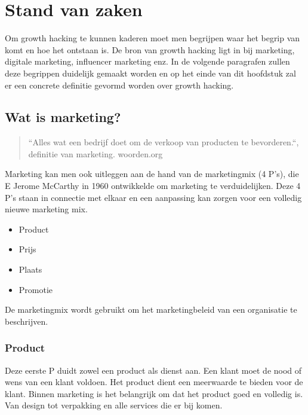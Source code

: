 \chapter{Stand van zaken}
\label{ch:stand-van-zaken}


Om growth hacking te kunnen kaderen moet men begrijpen waar het begrip van komt en hoe het ontstaan is. De bron van growth hacking ligt in bij marketing, digitale marketing, influencer marketing enz. In de volgende paragrafen zullen deze begrippen duidelijk gemaakt worden en op het einde van dit hoofdstuk zal er een concrete definitie gevormd worden over growth hacking.

\section{Wat is marketing?}
\label{sec:marketing}
\begin{quote}
	``Alles wat een bedrijf doet om de verkoop van producten te bevorderen.``, definitie van marketing. \textcopyright  woorden.org
\end{quote}
Marketing kan men ook uitleggen aan de hand van de marketingmix (4 P's), die E Jerome McCarthy in 1960 ontwikkelde om marketing te verduidelijken. Deze 4 P's staan in connectie met elkaar en een aanpassing kan zorgen voor een volledig nieuwe marketing mix.

\begin{itemize}
	\item Product
	\item Prijs
	\item Plaats
	\item Promotie
\end{itemize}

De marketingmix wordt gebruikt om het marketingbeleid van een organisatie te beschrijven. 

\subsection{Product}
\label{sec:marketing-product}
Deze eerste P duidt zowel een product als dienst aan. Een klant moet de nood of wens van een klant voldoen. Het product dient een meerwaarde te bieden voor de klant. Binnen marketing is het belangrijk om dat het product goed en volledig is. Van design tot verpakking en alle services die er bij komen.
 
